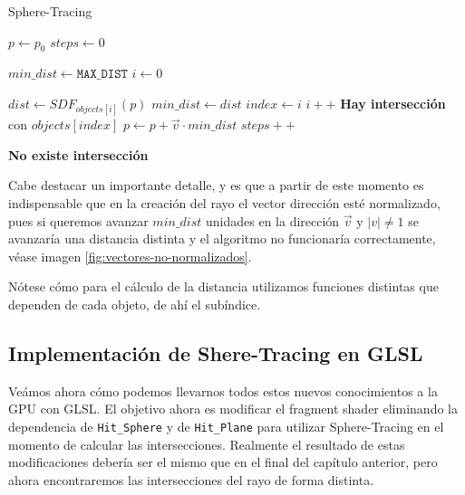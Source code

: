\begin{algorithm}[H]
\caption{Sphere-Tracing} \label{alg:Sphere-Tracing}
\begin{algorithmic}
\State $p\gets p_0$
\State $steps \gets 0$

 
    \State $min\_dist \gets \mathtt{MAX\_DIST}$
    \State $i\gets 0$
    
        \State $dist \gets SDF_{objects[i]}(p)$
            \State $min\_dist \gets dist$
            \State $index\gets i$
        \EndIf
        \State $i++$
    \EndWhile
        \State \textbf{Hay intersección} con $objects[index]$
    \Else
        \State $p\gets p + \vec v \cdot min\_dist$ 
    \EndIf
    \State $steps++$
\EndWhile

\State \textbf{No existe intersección}
\EndProcedure
\end{algorithmic}
\end{algorithm}

\begin{observacion}
\label{observacion:vector-normalizado}
    Cabe destacar un importante detalle, y es que a partir de este momento es indispensable que en la creación del rayo el vector dirección esté normalizado, pues si queremos avanzar $min\_dist$ unidades en la dirección $\vec v$ y $|v| \not= 1$ se avanzaría una distancia distinta y el algoritmo no funcionaría correctamente, véase imagen \ref{fig:vectores-no-normalizados}.
\end{observacion}

Nótese cómo para el cálculo de la distancia utilizamos funciones distintas que dependen de cada objeto, de ahí el subíndice.

\subsection{Implementación de Shere-Tracing en GLSL}

Veámos ahora cómo podemos llevarnos todos estos nuevos conocimientos a la GPU con GLSL. El objetivo ahora es modificar el fragment shader eliminando la dependencia de \verb|Hit_Sphere| y de \verb|Hit_Plane| para utilizar Sphere-Tracing en el momento de calcular las intersecciones. Realmente el resultado de estas modificaciones debería ser el mismo que en el final del capítulo anterior, pero ahora encontraremos las intersecciones del rayo de forma distinta. 

